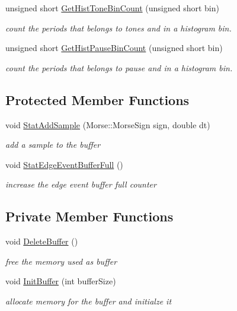 \begin{DoxyCompactItemize}
unsigned short \hyperlink{classMorseStatistic_a3467fc7a0aac07feeb1d47805dd603cf}{Get\+Hist\+Tone\+Bin\+Count} (unsigned short bin)
\begin{DoxyCompactList}\small\item\em count the periods that belongs to tones and in a histogram bin. \end{DoxyCompactList}\item 
unsigned short \hyperlink{classMorseStatistic_a4e8fd6695aa502fa339d6a65efb297a7}{Get\+Hist\+Pause\+Bin\+Count} (unsigned short bin)
\begin{DoxyCompactList}\small\item\em count the periods that belongs to pause and in a histogram bin. \end{DoxyCompactList}\end{DoxyCompactItemize}
\subsection*{Protected Member Functions}
\begin{DoxyCompactItemize}
\item 
void \hyperlink{classMorseStatistic_afc0c1198ba34c154ce613591861a339b}{Stat\+Add\+Sample} (Morse\+::\+Morse\+Sign sign, double dt)
\begin{DoxyCompactList}\small\item\em add a sample to the buffer \end{DoxyCompactList}\item 
\mbox{\label{classMorseStatistic_a9caf4881a3a6843aa0aafd1aeaee14e2}} 
void \hyperlink{classMorseStatistic_a9caf4881a3a6843aa0aafd1aeaee14e2}{Stat\+Edge\+Event\+Buffer\+Full} ()
\begin{DoxyCompactList}\small\item\em increase the edge event buffer full counter \end{DoxyCompactList}\end{DoxyCompactItemize}
\subsection*{Private Member Functions}
\begin{DoxyCompactItemize}
\item 
\mbox{\label{classMorseStatistic_a512955d403a9906f15d550e3f731d810}} 
void \hyperlink{classMorseStatistic_a512955d403a9906f15d550e3f731d810}{Delete\+Buffer} ()
\begin{DoxyCompactList}\small\item\em free the memory used as buffer \end{DoxyCompactList}\item 
void \hyperlink{classMorseStatistic_adc79128f3c472bef513ce8546c833834}{Init\+Buffer} (int buffer\+Size)
\begin{DoxyCompactList}\small\item\em allocate memory for the buffer and initialze it \end{DoxyCompactList}\end{DoxyCompactItemize}
